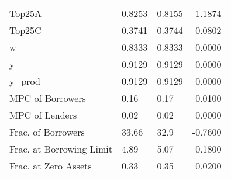 \begin{table}
\begin{tabular}{lllr}
                  Top25A &  0.8253 &   0.8155 & -1.1874 \\
                  Top25C &  0.3741 &   0.3744 &  0.0802 \\
                       w &  0.8333 &   0.8333 &  0.0000 \\
                       y &  0.9129 &   0.9129 &  0.0000 \\
                  y\_prod &  0.9129 &   0.9129 &  0.0000 \\
        MPC of Borrowers &    0.16 &     0.17 &  0.0100 \\
          MPC of Lenders &    0.02 &     0.02 &  0.0000 \\
      Frac. of Borrowers &   33.66 &     32.9 & -0.7600 \\
Frac. at Borrowing Limit &    4.89 &     5.07 &  0.1800 \\
    Frac. at Zero Assets &    0.33 &     0.35 &  0.0200 \\
\bottomrule
\end{tabular}
\end{table}
